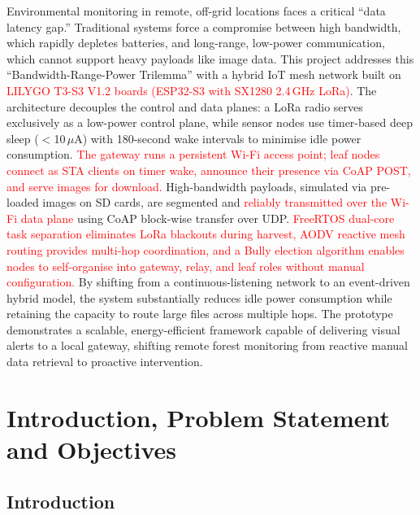 \documentclass[12pt,a4paper]{article}
\newcommand{\changed}[1]{\textcolor{red}{#1}}
\begin{document}
Environmental monitoring in remote, off-grid locations faces a critical ``data latency gap.'' Traditional systems force a compromise between high bandwidth, which rapidly depletes batteries, and long-range, low-power communication, which cannot support heavy payloads like image data. This project addresses this ``Bandwidth-Range-Power Trilemma'' with a hybrid IoT mesh network built on \changed{LILYGO T3-S3 V1.2 boards (ESP32-S3 with SX1280 2.4\,GHz LoRa)}. The architecture decouples the control and data planes: a LoRa radio serves exclusively as a low-power control plane, while sensor nodes use timer-based deep sleep ($<$10\,$\mu$A) with 180-second wake intervals to minimise idle power consumption. \changed{The gateway runs a persistent Wi-Fi access point; leaf nodes connect as STA clients on timer wake, announce their presence via CoAP POST, and serve images for download.} High-bandwidth payloads, simulated via pre-loaded images on SD cards, are segmented and \changed{reliably transmitted over the Wi-Fi data plane} using CoAP block-wise transfer over UDP. \changed{FreeRTOS dual-core task separation eliminates LoRa blackouts during harvest, AODV reactive mesh routing provides multi-hop coordination, and a Bully election algorithm enables nodes to self-organise into gateway, relay, and leaf roles without manual configuration.} By shifting from a continuous-listening network to an event-driven hybrid model, the system substantially reduces idle power consumption while retaining the capacity to route large files across multiple hops. The prototype demonstrates a scalable, energy-efficient framework capable of delivering visual alerts to a local gateway, shifting remote forest monitoring from reactive manual data retrieval to proactive intervention.

\newpage


\section{Introduction, Problem Statement and Objectives}

\subsection{Introduction}
\end{document}
